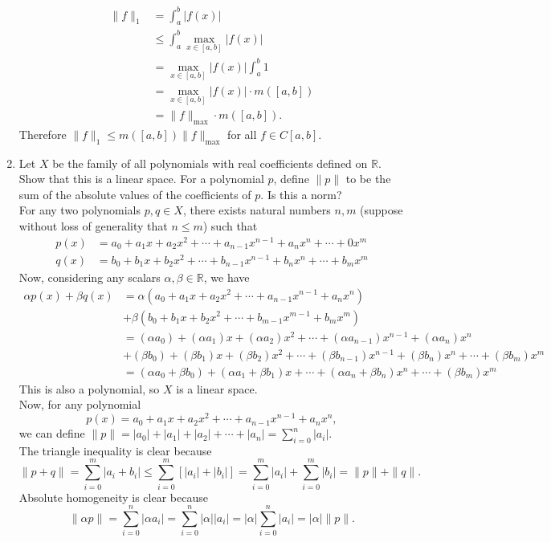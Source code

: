 \begin{enumerate}
	\begin{align*}
	\|f\|_1 &= \int_a^b|f(x)|\\ 
	&\le \int_a^b\max_{x\in [a,b]}|f(x)|\\
	&=\max_{x\in [a,b]}|f(x)| \int_a^b1\\
	&= \max_{x\in [a,b]}|f(x)| \cdot m([a,b]) \\
	&= \|f\|_{\max} \cdot m([a,b]).
	\end{align*}
	Therefore $\|f\|_1\le m([a,b])\|f\|_{\max}$ for all $f\in C[a,b]$.
	\item Let $X$ be the family of all polynomials with real coefficients defined on $\mathbb{R}$.
	Show that this is a linear space. For a polynomial $p$, define $\| p\|$ to be the sum of the absolute values of the coefficients of $p$.
	Is this a norm?\\
	For any two polynomials $p,q\in X$, there exists natural numbers $n,m$ (suppose without loss of generality that $n\le m$) such that
	\begin{align*}
	p(x) &= a_0+a_1x+a_2x^2+\cdots+a_{n-1}x^{n-1}+a_nx^n+\cdots+0x^m	\\
	q(x) &= b_0+b_1x+b_2x^2+\cdots+b_{n-1}x^{n-1}+b_nx^n+\cdots+b_mx^m	
	\end{align*}
	Now, considering any scalars $\alpha,\beta \in \mathbb{R}$, we have
	\begin{align*}
		\alpha p(x) + \beta q(x) &= \alpha (a_0+a_1x+a_2x^2+\cdots+a_{n-1}x^{n-1}+a_nx^n)\\
		&+ \beta (b_0+b_1x+b_2x^2+\cdots+b_{m-1}x^{m-1}+b_mx^m)\\
		&=(\alpha a_0)+(\alpha a_1)x+(\alpha a_2)x^2+\cdots+(\alpha a_{n-1})x^{n-1}+(\alpha a_n)x^n\\
		&+ (\beta b_0)+(\beta b_1)x+(\beta b_2)x^2+\cdots+(\beta b_{n-1})x^{n-1}+(\beta b_n)x^n+\cdots+(\beta b_m)x^m\\
		&=(\alpha a_0+\beta b_0)+(\alpha a_1+\beta b_1)x+\cdots+(\alpha a_n+\beta b_n)x^n+\cdots+(\beta b_m)x^m
	\end{align*}
	This is also a polynomial, so $X$ is a linear space.\\
	Now, for any polynomial
	\[
		p(x) = a_0+a_1x+a_2x^2+\cdots+a_{n-1}x^{n-1}+a_nx^n,	
	\]
	we can define $\|p\| = |a_0|+|a_1|+|a_2|+\cdots+|a_n| = \sum_{i=0}^n|a_i|$.\\
	The triangle inequality is clear because 
	\[
		\|p+q\| = \sum_{i=0}^{m}|a_i+b_i|\le\sum_{i=0}^{m}[|a_i|+|b_i|]=\sum_{i=0}^{m}|a_i|+\sum_{i=0}^{m}|b_i|=\|p\|+\|q\|.
	\]
	Absolute homogeneity is clear because
	\[
		\|\alpha p\| = \sum_{i=0}^n|\alpha a_i|= \sum_{i=0}^n|\alpha|| a_i|=|\alpha|\sum_{i=0}^n| a_i|=|\alpha|\|p\|.
\]
\end{enumerate}
